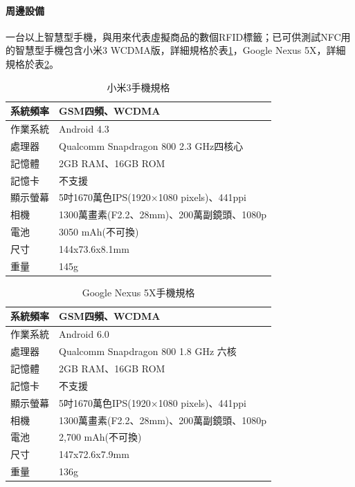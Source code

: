  			\paragraph{周邊設備}一台以上智慧型手機，與用來代表虛擬商品的數個RFID標籤；已可供測試NFC用的智慧型手機包含小米3 WCDMA版，詳細規格於表\ref{mi}，Google Nexus 5X，詳細規格於表\ref{5x}。
	 			\begin{table}[htbp]
				\centering
				\caption{小米3手機規格}
				\label{mi}
				\begin{tabular}{|l|l|}
				\hline
				系統頻率 & GSM四頻、WCDMA \\ \hline
				作業系統 & Android 4.3 \\ \hline
				處理器 & Qualcomm Snapdragon 800 2.3 GHz四核心 \\ \hline
				記憶體 & 2GB RAM、16GB ROM \\ \hline
				記憶卡 & 不支援 \\ \hline
				顯示螢幕 & 5吋1670萬色IPS(1920×1080 pixels)、441ppi \\ \hline
				相機 & 1300萬畫素(F2.2、28mm)、200萬副鏡頭、1080p \\ \hline
				電池 & 3050 mAh(不可換) \\ \hline
				尺寸 & 144x73.6x8.1mm \\ \hline
				重量 & 145g \\ \hline
				\end{tabular}
				\end{table}

				\begin{table}[htbp]
				\centering
				\caption{Google Nexus 5X手機規格}
				\label{5x}
				\begin{tabular}{|l|l|}
				\hline
				系統頻率 & GSM四頻、WCDMA \\ \hline
				作業系統 & Android 6.0 \\ \hline
				處理器 & Qualcomm Snapdragon 800 1.8 GHz 六核 \\ \hline
				記憶體 & 2GB RAM、16GB ROM \\ \hline
				記憶卡 & 不支援 \\ \hline
				顯示螢幕 & 5吋1670萬色IPS(1920×1080 pixels)、441ppi \\ \hline
				相機 & 1300萬畫素(F2.2、28mm)、200萬副鏡頭、1080p \\ \hline
				電池 & 2,700 mAh(不可換) \\ \hline
				尺寸 & 147x72.6x7.9mm \\ \hline
				重量 & 136g \\ \hline
				\end{tabular}
				\end{table}

